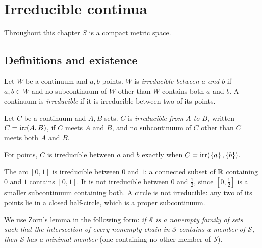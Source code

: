 \chapter{Irreducible continua}\label{ch:irreducible}

Throughout this chapter $S$ is a compact metric space.

\section{Definitions and existence}

\begin{definition}\label{def:irreducible}
Let $W$ be a continuum and $a,b$ points. $W$ is \emph{irreducible between $a$ and $b$} if $a,b\in W$
and no subcontinuum of $W$ other than $W$ contains both $a$ and $b$. A continuum is
\emph{irreducible} if it is irreducible between two of its points.
\end{definition}


\begin{definition}\label{def:irr-sets}
Let $C$ be a continuum and $A,B$ sets. $C$ is \emph{irreducible from $A$ to $B$}, written
$C=\operatorname{irr}(A,B)$, if $C$ meets $A$ and $B$, and no subcontinuum of $C$ other than $C$ meets both $A$
and $B$.
\end{definition}


For points, $C$ is irreducible between $a$ and $b$ exactly when $C=\operatorname{irr}(\left\{ a \right\},\left\{ b \right\})$.

\begin{example}\label{ex:arc-irr}
The arc $[0,1]$ is irreducible between $0$ and $1$: a connected subset of $\mathbb{R}$ containing $0$ and
$1$ contains $[0,1]$. It is not irreducible between $0$ and $\frac12$, since $[0,\frac12]$ is a
smaller subcontinuum containing both. A circle is not irreducible: any two of its points lie in
a closed half-circle, which is a proper subcontinuum.
\end{example}

We use Zorn's lemma in the following form: \emph{if $\mathcal S$ is a nonempty family of sets such
that the intersection of every nonempty chain in $\mathcal S$ contains a member of $\mathcal S$,
then $\mathcal S$ has a minimal member} (one containing no other member of $\mathcal S$).

